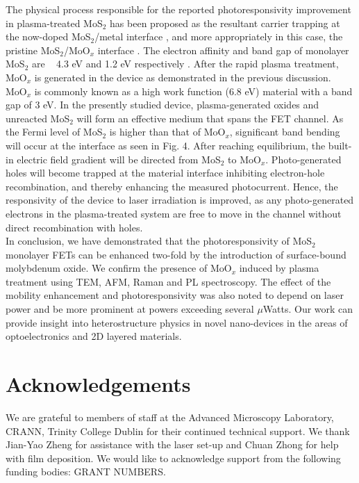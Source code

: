 \documentclass[%
 reprint,
superscriptaddress,
 amsmath,amssymb,
 aps,
prb,
]{revtex4-1}
\begin{document}
\indent The physical process responsible for the reported photoresponsivity improvement in plasma-treated MoS$_2$ has been proposed as the resultant carrier trapping at the now-doped MoS$_2$/metal interface \cite{wi2014enhancement}, and more appropriately in this case, the pristine MoS$_2$/MoO$_x$ interface \cite{Yoo2017}.
The electron affinity and band gap of monolayer MoS$_2$ are ~ 4.3 eV and 1.2 eV respectively \cite{Liang2013,Mak2010a}. After the rapid plasma treatment, MoO$_x$ is generated in the device as demonstrated in the previous discussion. MoO$_x$ is commonly known as a high work function (6.8 eV) material with a band gap of 3 eV.\cite{Kang2014, Yoo2017} In the presently studied device, plasma-generated oxides and unreacted MoS$_2$ will form an effective medium that spans the FET channel. As the Fermi
level of MoS$_2$ is higher than that of MoO$_x$, significant band bending will occur at the interface as seen in Fig. 4. After reaching equilibrium, the built-in electric field gradient will be directed from MoS$_2$ to MoO$_x$. Photo-generated holes will become trapped at the material interface inhibiting electron-hole recombination, and thereby enhancing the measured
photocurrent. Hence, the responsivity of the device to laser irradiation is improved, as any photo-generated electrons in the plasma-treated system are free to move in the channel without direct recombination with holes. \\

\indent In conclusion, we have demonstrated that the photoresponsivity of MoS$_2$ monolayer FETs can be enhanced two-fold by the introduction of surface-bound molybdenum oxide. We confirm the presence of MoO$_x$ induced by plasma treatment using TEM, AFM, Raman and PL spectroscopy. The effect of the mobility enhancement and photoresponsivity was also noted to depend on laser power and be more prominent at powers exceeding several $\mu$Watts. Our work can provide insight into heterostructure physics in novel nano-devices in the areas of optoelectronics and 2D layered materials. 





\section*{Acknowledgements}

We are grateful to members of staff at the Advanced Microscopy Laboratory, CRANN, Trinity College Dublin for their continued technical support. We thank Jian-Yao Zheng for assistance with the laser set-up and Chuan Zhong for help with film deposition. We would like to acknowledge support from the following funding bodies: GRANT NUMBERS.





 
\end{document}
